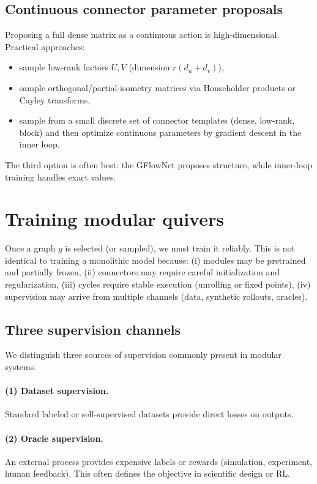 \documentclass[11pt]{article}
\theoremstyle{definition}
\theoremstyle{plain}
\theoremstyle{remark}
\begin{document}
\subsection{Continuous connector parameter proposals}
Proposing a full dense matrix as a continuous action is high-dimensional.
Practical approaches:
\begin{itemize}[leftmargin=2em]
\item sample low-rank factors $U,V$ (dimension $r(d_u+d_v)$),
\item sample orthogonal/partial-isometry matrices via Householder products or Cayley transforms,
\item sample from a small discrete set of connector templates (dense, low-rank, block) and then optimize continuous parameters by gradient descent in the inner loop.
\end{itemize}
The third option is often best: the GFlowNet proposes structure, while inner-loop training handles exact values.

\newpage

\section{Training modular quivers}
\label{sec:training}

Once a graph $g$ is selected (or sampled), we must train it reliably.
This is not identical to training a monolithic model because:
(i) modules may be pretrained and partially frozen,
(ii) connectors may require careful initialization and regularization,
(iii) cycles require stable execution (unrolling or fixed points),
(iv) supervision may arrive from multiple channels (data, synthetic rollouts, oracles).

\subsection{Three supervision channels}
\label{sec:supervision}

We distinguish three sources of supervision commonly present in modular systems.

\paragraph{(1) Dataset supervision.}
Standard labeled or self-supervised datasets provide direct losses on outputs.

\paragraph{(2) Oracle supervision.}
An external process provides expensive labels or rewards (simulation, experiment, human feedback).
This often defines the objective in scientific design or RL.
\end{document}
